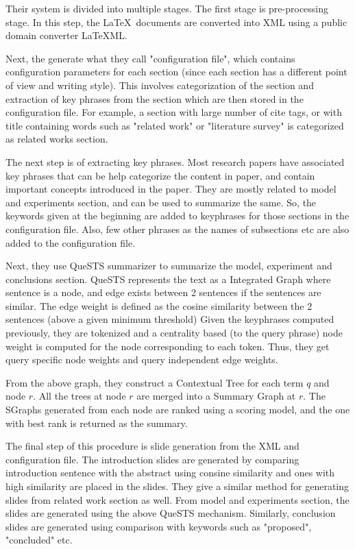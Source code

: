 \documentclass[conference]{IEEEtran}
\begin{document}
Their system is divided into multiple stages. The first stage is pre-processing stage.
In this step, the \LaTeX\ documents are converted into XML using a public domain converter
LaTeXML. 

Next, the generate what they call "configuration file", which contains configuration
parameters for each section (since each section has a different point of view and writing style).
This involves categorization of the section and extraction of key phrases from the section
which are then stored in the configuration file.
For example, a section with large number of cite tags, or with title containing words such as
"related work" or "literature survey" is categorized as related works section.

The next step is of extracting key phrases.	Most research papers have associated key phrases 
that can be help categorize the content in paper, and contain important concepts introduced
in the paper. They are mostly related to model and experiments section, and can be used to 
summarize the same. So, the keywords given at the beginning are added to keyphrases for those
sections in the configuration file. Also, few other phrases as the names of subsections etc 
are also added to the configuration file.

Next, they use QueSTS summarizer to summarize the model, experiment and conclusions section.
QueSTS represents the text as a Integrated Graph where sentence is a node, and edge exists 
between 2 sentences if the sentences are similar. The edge weight is defined as the 
cosine similarity between the 2 sentences (above a given minimum threshold)
Given the keyphrases computed previously, they are tokenized and 
a centrality based (to the query phrase) node weight is computed for the node corresponding to each token.
Thus, they get query specific node weights and query independent edge weights.

From the above graph, they construct a Contextual Tree for each term $q$ and node $r$.
All the trees at node $r$ are merged into a Summary Graph at $r$. The SGraphs generated
from each node are ranked using a scoring model, and the one with best rank is returned as
the summary.

The final step of this procedure is slide generation from the XML and configuration file.
The introduction slides are generated by comparing introduction sentence with the abstract 
using consine similarity and ones with high similarity are placed in the slides.
They give a similar method for generating slides from related work section as well.
From model and experiments section, the slides are generated using the above QueSTS
mechanism. Similarly, conclusion slides are generated using comparison with keywords
such as "proposed", "concluded" etc.
\end{document}
